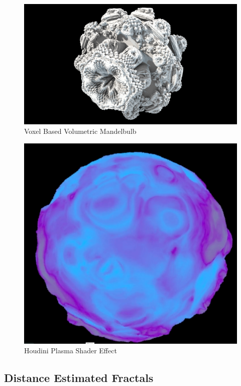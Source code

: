 \documentclass[11pt,a4paper,final,notitlepage]{report}
\begin{document}
\begin{figure}
\begin{center}
\includegraphics[scale=0.2]{"images/houdini_mandelbulb"}
\caption{Voxel Based Volumetric Mandelbulb}
\label{fig:voxelbulb}
\end{center}
\end{figure}

\begin{figure}
\begin{center}
\includegraphics[scale=0.2]{"images/noise_shader"}
\caption{Houdini Plasma Shader Effect}
\label{fig:noise_shader}
\end{center}
\end{figure}


\subsection{Distance Estimated Fractals}
\end{document}
